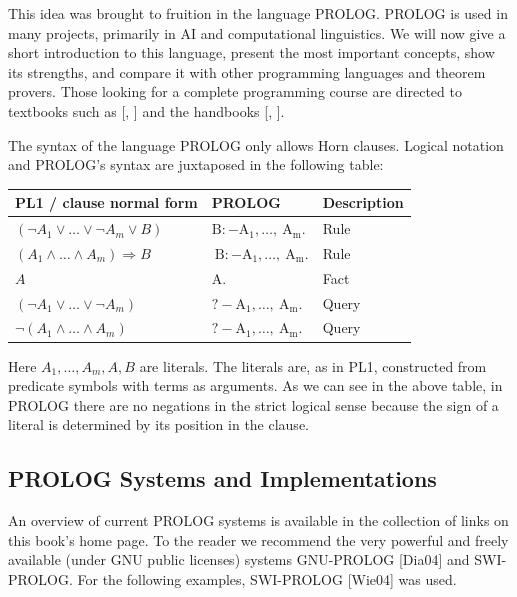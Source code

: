 \documentclass[10pt]{book}
\begin{document}
This idea was brought to fruition in the language PROLOG. PROLOG is used in many projects, primarily in AI and computational linguistics. We will now give a short introduction to this language, present the most important concepts, show its strengths, and compare it with other programming languages and theorem provers. Those looking for a complete programming course are directed to textbooks such as [\cite{bratko2011prolog}, \cite{clocksin1994programming}] and the handbooks [\cite{wielemaker2004swiprolog}, \cite{diaz2004gnuprolog}].

The syntax of the language PROLOG only allows Horn clauses. Logical notation and PROLOG's syntax are juxtaposed in the following table:

\begin{center}
\begin{tabular}{lll}
\hline
PL1 / clause normal form & PROLOG & Description \\
\hline
$\left(\neg A_{1} \vee \ldots \vee \neg A_{m} \vee B\right)$ & $\mathrm{B}:-\mathrm{A}_{1}, \ldots, \mathrm{~A}_{\mathrm{m}}$. & Rule \\
\hline
$\left(A_{1} \wedge \ldots \wedge A_{m}\right) \Rightarrow B$ & $\mathrm{~B}:-\mathrm{A}_{1}, \ldots, \mathrm{~A}_{\mathrm{m}}$. & Rule \\
\hline
$A$ & A. & Fact \\
\hline
$\left(\neg A_{1} \vee \ldots \vee \neg A_{m}\right)$ & $?-\mathrm{A}_{1}, \ldots, \mathrm{~A}_{\mathrm{m}}$. & Query \\
\hline
$\neg\left(A_{1} \wedge \ldots \wedge A_{m}\right)$ & $?-\mathrm{A}_{1}, \ldots, \mathrm{~A}_{\mathrm{m}}$. & Query \\
\hline
\end{tabular}
\end{center}

Here $A_{1}, \ldots, A_{m}, A, B$ are literals. The literals are, as in PL1, constructed from predicate symbols with terms as arguments. As we can see in the above table, in PROLOG there are no negations in the strict logical sense because the sign of a literal is determined by its position in the clause.

\subsection{PROLOG Systems and Implementations}
An overview of current PROLOG systems is available in the collection of links on this book's home page. To the reader we recommend the very powerful and freely available (under GNU public licenses) systems GNU-PROLOG [Dia04] and SWI-PROLOG. For the following examples, SWI-PROLOG [Wie04] was used.
\end{document}
